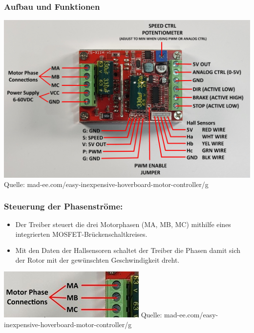 \documentclass[ngerman,12pt,a4paper]{article}
\begin{document}
			\subsubsection{Aufbau und Funktionen}
			
		\begin{center}
			\begin{minipage}{\textwidth}
				\centering
				\includegraphics[scale=0.15]{Pictures/ZS-X11H}
				\label{fig:spiffs_init}
				\vspace{-2pt}
				\small Quelle: mad-ee.com/easy-inexpensive-hoverboard-motor-controller/g
			\end{minipage}
		\end{center}
		\newpage
		\subsubsection*{Steuerung der Phasenströme:}
		\begin{itemize}
			\item Der Treiber steuert die drei Motorphasen (MA, MB, MC) mithilfe eines integrierten MOSFET-Brückenschaltkreises.
			\item Mit den Daten der Hallsensoren schaltet der Treiber die Phasen damit sich der Rotor mit der gewünschten Geschwindigkeit dreht.
		\end{itemize}
		
		\begin{center}
			\begin{minipage}{\textwidth}
				\centering
				\includegraphics[scale=1]{Pictures/Motorphasen}
				\label{fig:spiffs_init}
				\vspace{-2pt}
				\small Quelle: mad-ee.com/easy-inexpensive-hoverboard-motor-controller/g
			\end{minipage}
		\end{center}
		
\end{document}
